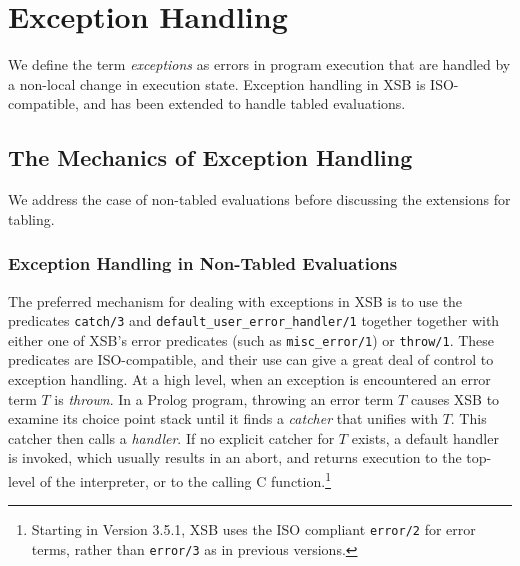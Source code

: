 \chapter{Exception Handling}\label{chap:exception}

We define the term {\em exceptions} as errors in program execution
that are handled by a non-local change in execution state.  Exception
handling in XSB is ISO-compatible, and has been extended to handle
tabled evaluations.  

\section{The Mechanics of Exception Handling}
%
We address the case of non-tabled evaluations before discussing the
extensions for tabling.

\subsection{Exception Handling in Non-Tabled Evaluations}
%
The preferred mechanism for dealing with exceptions in XSB is to use
the predicates {\tt catch/3} and {\tt default\_user\_error\_handler/1}
together together with either one of XSB's error predicates (such as
{\tt misc\_error/1}) or {\tt throw/1}.  These predicates are
ISO-compatible, and their use can give a great deal of control to
exception handling.  At a high level, when an exception is encountered
an error term $T$ is {\em thrown}.  In a Prolog program, throwing an
error term $T$ causes XSB to examine its choice point stack until it
finds a {\em catcher} that unifies with $T$.  This catcher then calls
a {\em handler}.  If no explicit catcher for $T$ exists, a default
handler is invoked, which usually results in an abort, and returns
execution to the top-level of the interpreter, or to the calling C
function.\footnote{Starting in Version 3.5.1, XSB uses the ISO
  compliant {\tt error/2} for error terms, rather than {\tt error/3}
  as in previous versions.}

